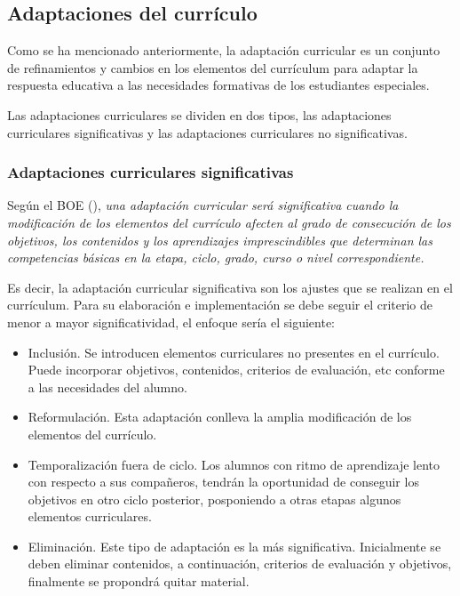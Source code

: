 \subsection{Adaptaciones del currículo}

Como se ha mencionado anteriormente, la adaptación curricular es un conjunto de refinamientos y cambios en los elementos del currículum para adaptar la respuesta educativa a las necesidades formativas de los estudiantes especiales. 

Las adaptaciones curriculares se dividen en dos tipos, las adaptaciones curriculares significativas y las adaptaciones curriculares no significativas. 
\subsubsection{Adaptaciones curriculares significativas}
Según el BOE (\citeyear{BOE}), \textit{una adaptación curricular será significativa cuando la modificación de los elementos del currículo afecten al grado de consecución de los objetivos, los contenidos y los aprendizajes imprescindibles que determinan las competencias básicas en la etapa, ciclo, grado, curso o nivel correspondiente. }

Es decir, la adaptación curricular significativa son los ajustes que se realizan en el currículum. Para su elaboración e implementación se debe seguir el criterio de menor a mayor significatividad, el enfoque sería el siguiente:
\begin{itemize}
    \item Inclusión. Se introducen elementos curriculares no presentes en el currículo. Puede incorporar objetivos, contenidos, criterios de evaluación, etc conforme a las necesidades del alumno.
    \item Reformulación. Esta adaptación conlleva la amplia modificación de los elementos del currículo.
    \item Temporalización fuera de ciclo. Los alumnos con ritmo de aprendizaje lento con respecto a sus compañeros, tendrán la oportunidad de conseguir los objetivos en otro ciclo posterior, posponiendo a otras etapas algunos elementos curriculares.
    \item Eliminación. Este tipo de adaptación es la más significativa. Inicialmente se deben eliminar contenidos, a continuación, criterios de evaluación y objetivos, finalmente se propondrá quitar material.
\end{itemize}

